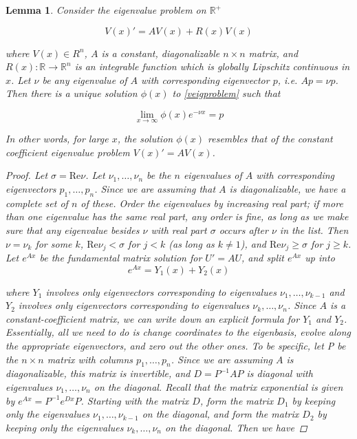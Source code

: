 \documentclass[12pt]{article}
\def\R{{\mathbb R}}
\newtheorem{lemma}{Lemma}
\begin{document}
\begin{lemma}Consider the eigenvalue problem on $\R^+$

\begin{equation}\label{veigproblem}
V(x)' = AV(x) + R(x)V(x)
\end{equation}

where $V(x) \in R^n$, $A$ is a constant, diagonalizable $n \times n$ matrix, and $R(x): \R \rightarrow \R^n$ is an integrable function which is globally Lipschitz continuous in $x$. Let $\nu$ be any eigenvalue of $A$ with corresponding eigenvector $p$, i.e. $A p = \nu p$. Then there is a unique solution $\phi(x)$ to \eqref{veigproblem} such that 

\[
\lim_{x\rightarrow\infty} \phi(x) e^{-\nu x} = p
\]

In other words, for large $x$, the solution $\phi(x)$ resembles that of the constant coefficient eigenvalue problem $V(x)' = AV(x)$.

\begin{proof}
Let $\sigma = \text{Re} \nu$. Let $\nu_1, \dots, \nu_n$ be the $n$ eigenvalues of $A$ with corresponding eigenvectors $p_1, \dots, p_n$. Since we are assuming that $A$ is diagonalizable, we have a complete set of $n$ of these. Order the eigenvalues by increasing real part; if more than one eigenvalue has the same real part, any order is fine, as long as we make sure that any eigenvalue besides $\nu$ with real part $\sigma$ occurs after $\nu$ in the list. Then $\nu = \nu_k$ for some $k$, $\text{Re} \nu_j < \sigma$ for $j < k$ (as long as $k \neq 1$), and $\text{Re} \nu_j \geq \sigma$ for $j \geq k$. \\

Let $e^{Ax}$ be the fundamental matrix solution for $U' = A U$, and split $e^{Ax}$ up into
\[
e^{Ax} = Y_1(x) + Y_2(x)
\]

where $Y_1$ involves only eigenvectors corresponding to eigenvalues $\nu_1, \dots, \nu_{k-1}$ and $Y_2$ involves only eigenvectors corresponding to eigenvalues $\nu_{k}, \dots, \nu_n$. Since $A$ is a constant-coefficient matrix, we can write down an explicit formula for $Y_1$ and $Y_2$. Essentially, all we need to do is change coordinates to the eigenbasis, evolve along the appropriate eigenvectors, and zero out the other ones. To be specific, let P be the $n \times n$ matrix with columns $p_1, \dots, p_n$. Since we are assuming $A$ is diagonalizable, this matrix is invertible, and $D = P^{-1}AP$ is diagonal with eigenvalues $\nu_1, \dots, \nu_n$ on the diagonal. Recall that the matrix exponential is given by $e^{Ax} = P^{-1}e^{Dx}P$. Starting with the matrix $D$, form the matrix $D_1$ by keeping only the eigenvalues $\nu_1, \dots, \nu_{k-1}$ on the diagonal, and form the matrix $D_2$ by keeping only the eigenvalues $\nu_{k}, \dots, \nu_n$ on the diagonal. Then we have


\end{proof}
\end{lemma}
\end{document}
